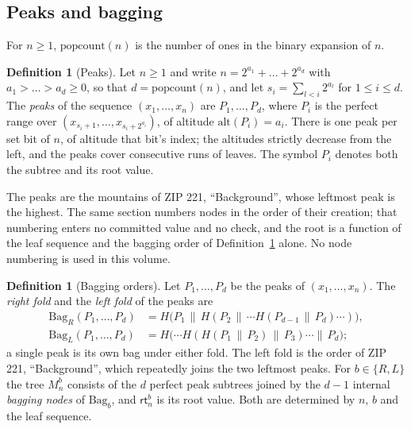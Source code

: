 \documentclass[11pt,a4paper]{article}
\theoremstyle{definition}
\newtheorem{definition}[theorem]{Definition}
\begin{document}
\subsection{Peaks and bagging}\label{sec:mmr-peaks}

For $n\ge 1$, $\mathrm{popcount}(n)$ is the number of ones in the binary
expansion of $n$.

\begin{definition}[Peaks]\label{def:peaks}
Let $n\ge 1$ and write $n=2^{a_1}+\dots+2^{a_d}$ with
$a_1>\dots>a_d\ge 0$, so that $d=\mathrm{popcount}(n)$, and let
$s_i=\sum_{l<i}2^{a_l}$ for $1\le i\le d$. The \emph{peaks} of the sequence
$(x_1,\dots,x_n)$ are $P_1,\dots,P_d$, where $P_i$ is the perfect range over
$(x_{s_i+1},\dots,x_{s_i+2^{a_i}})$, of altitude $\mathrm{alt}(P_i)=a_i$.
There is one peak per set bit of $n$, of altitude that bit's index; the
altitudes strictly decrease from the left, and the peaks cover consecutive
runs of leaves. The symbol $P_i$ denotes both the subtree and its root value.
\end{definition}

The peaks are the mountains of ZIP 221, ``Background'', whose leftmost peak is
the highest. The same section numbers nodes in the order of their creation;
that numbering enters no committed value and no check, and the root is a
function of the leaf sequence and the bagging order of
Definition~\ref{def:bagging} alone. No node numbering is used in this volume.

\begin{definition}[Bagging orders]\label{def:bagging}
Let $P_1,\dots,P_d$ be the peaks of $(x_1,\dots,x_n)$. The \emph{right fold}
and the \emph{left fold} of the peaks are
\begin{align*}
  \mathrm{Bag}_R(P_1,\dots,P_d)
    &= H\bigl(P_1\,\|\,H(P_2\,\|\,\cdots H(P_{d-1}\,\|\,P_d)\cdots)\bigr),\\
  \mathrm{Bag}_L(P_1,\dots,P_d)
    &= H\bigl(\cdots H(H(P_1\,\|\,P_2)\,\|\,P_3)\cdots\|\,P_d\bigr);
\end{align*}
a single peak is its own bag under either fold. The left fold is the order
of ZIP 221, ``Background'', which repeatedly joins the two leftmost peaks. For
$b\in\{R,L\}$ the tree $M^b_n$ consists of the $d$ perfect peak subtrees
joined by the $d-1$ internal \emph{bagging nodes} of $\mathrm{Bag}_b$, and
$\mathsf{rt}^b_n$ is its root value. Both are determined by $n$, $b$ and the
leaf sequence.
\end{definition}
\end{document}
